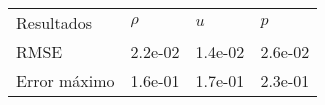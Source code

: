 \begin{tabular}{llll}
Resultados & $\rho$ & $u$ & $p$ \\
RMSE & 2.2e-02 & 1.4e-02 & 2.6e-02 \\
Error máximo & 1.6e-01 & 1.7e-01 & 2.3e-01 \\
\end{tabular}
